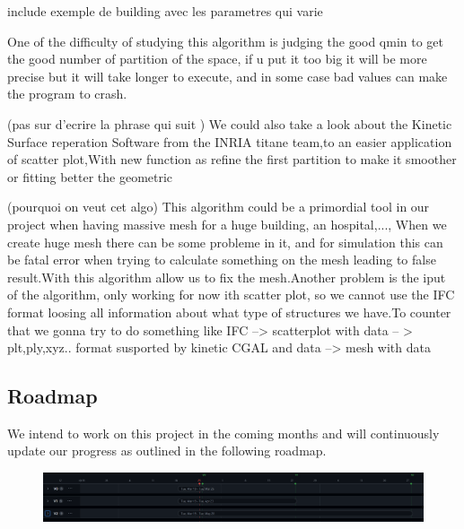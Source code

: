 \documentclass{article}
\begin{document}
include exemple de building avec les parametres qui varie 


One of the difficulty of studying this algorithm is judging the good qmin to get the good number of partition of the space, if u put it too big it will be more precise 
but it will take longer to  execute, and in some case bad values can make the program to crash.

(pas sur d'ecrire la phrase qui suit )
We could also take a look about the Kinetic Surface reperation Software from the INRIA titane team,to an easier application of scatter plot,With new function as refine the first partition to make it smoother or fitting better the geometric


(pourquoi on veut cet algo)
This algorithm could be a primordial tool in our project when having massive mesh for a huge building, an hospital,..., When we create huge mesh there can be some probleme in it, and for simulation this can be fatal error 
when trying to calculate something on the mesh leading to false result.With this algorithm allow us to fix the mesh.Another problem is the iput of the algorithm, only working for now ith scatter plot, so we cannot use the IFC format
loosing all information about what type of structures we have.To counter that we gonna try to do something like IFC --> scatterplot with data  -- > plt,ply,xyz.. format susported by kinetic CGAL and data  --> mesh with data 


\subsection{Roadmap}
We intend to work on this project in the coming months and will continuously update our progress as outlined in the following roadmap.
\begin{figure}[h]
    
    \includegraphics[scale =   0.3 ]{../images/roadmap.png}
    
\end{figure}
    
\nocite{*}


\end{document}
